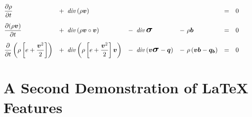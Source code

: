     {
        \small
        \begin{subequations}
            \begin{align}
                \label{Bilanzgleichungen in konservativer differentieller Form a}
                              & \pfrac{\rho}{t}           & + \      & \diverg \left( \rho \tvec{v} \right) &  &  &  &  & =
                \quad         & 0 \qquad
                \\[.5em]
                \label{Bilanzgleichungen in konservativer differentieller Form b}
                              & \pfrac{(\rho\tvec{v})}{t}
                              & + \                       &
                \diverg \left( \rho \tvec{v} \circ \tvec{v} \right)
                              & - \                       &
                \diverg \tenstress
                              & - \                       &
                \rho \tvec{b} & = \quad                   & 0 \qquad
                \\[.5em]
                \label{Bilanzgleichungen in konservativer differentieller Form c}
                              & \pfracbig{                                                                                  %
                    \left(
                    \rho \left[ e + \frac{\tvec{v}^2}{2} \right]
                    \right)}{t}
                              & + \                       &
                \diverg \left(
                \rho \left[ e + \frac{\tvec{v}^2}{2} \right] \tvec{v}
                \right)
                              & - \                       &
                \diverg \left( \tvec{v} \tenstress - \tvec{q} \right)
                              & - \                       &
                \rho \left( \tvec{v} \tvec{b} - \tvec{q_b} \right)
                              & = \quad                   & 0 \qquad
            \end{align}
        \end{subequations}
    }

\clearpage

\chapter[Demo 2]{A Second Demonstration of LaTeX Features}
\label{ch: A Second Demonstration of LaTeX Features}

